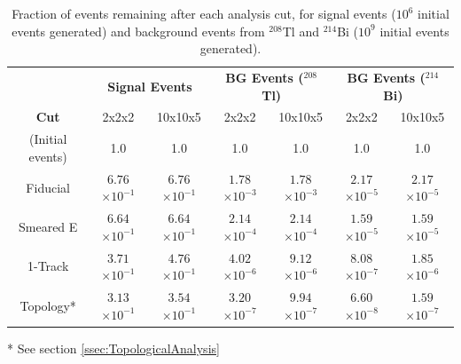 \documentclass[a4paper,11pt]{article}
\begin{document}
\begin{table}[!htb]
	\begin{center}
		\caption[Fast analysis summary]{\label{tbl.FastAnalysisResults}Fraction of events remaining after each analysis cut, for signal events ($10^6$ initial events generated) and background events from $^{208}$Tl and $^{214}$Bi ($10^9$ initial events generated).}
		\begin{tabular}{c|cc|cc|cc}
			\\
			 & \multicolumn{2}{c}{\textbf{Signal Events}} & \multicolumn{2}{c}{\textbf{BG Events ($^{208}$Tl)}} & \multicolumn{2}{c}{\textbf{BG Events ($^{214}$Bi)}}\\
			\textbf{Cut} & 2x2x2 & 10x10x5 & 2x2x2 & 10x10x5 & 2x2x2 & 10x10x5\\
			\hline
			(Initial events) & 1.0 & 1.0 & 1.0 & 1.0 & 1.0 & 1.0\\
			Fiducial & $6.76$\small{$\times 10^{-1}$} & $6.76$\small{$\times 10^{-1}$} & $1.78$\small{$\times 10^{-3}$} & $1.78$\small{$\times 10^{-3}$} & $2.17$\small{$\times 10^{-5}$} & $2.17$\small{$\times 10^{-5}$}\\
			Smeared E & $6.64$\small{$\times 10^{-1}$} & $6.64$\small{$\times 10^{-1}$} & $2.14$\small{$\times 10^{-4}$} & $2.14$\small{$\times 10^{-4}$} & $1.59$\small{$\times 10^{-5}$} & $1.59$\small{$\times 10^{-5}$}\\
			1-Track & $3.71$\small{$\times 10^{-1}$} & $4.76$\small{$\times 10^{-1}$} & $4.02$\small{$\times 10^{-6}$} & $9.12$\small{$\times 10^{-6}$} & $8.08$\small{$\times 10^{-7}$} & $1.85$\small{$\times 10^{-6}$}\\
			Topology* & $3.13$\small{$\times 10^{-1}$} & $3.54$\small{$\times 10^{-1}$} & $3.20$\small{$\times 10^{-7}$} & $9.94$\small{$\times 10^{-7}$} & $6.60$\small{$\times 10^{-8}$} & $1.59$\small{$\times 10^{-7}$}\\
		\end{tabular}
	\end{center}
	* See section \ref{ssec:TopologicalAnalysis}
\end{table}
\end{document}
